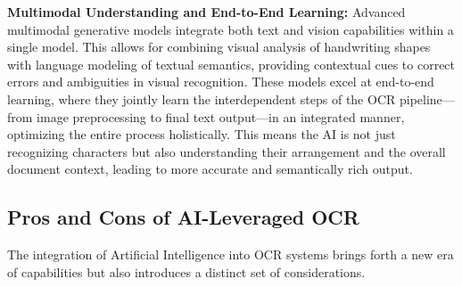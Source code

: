 \textbf{Multimodal Understanding and End-to-End Learning:} Advanced multimodal generative models integrate both text and vision capabilities within a single model. This allows for combining visual analysis of handwriting shapes with language modeling of textual semantics, providing contextual cues to correct errors and ambiguities in visual recognition. These models excel at end-to-end learning, where they jointly learn the interdependent steps of the OCR pipeline—from image preprocessing to final text output—in an integrated manner, optimizing the entire process holistically. This means the AI is not just recognizing characters but also understanding their arrangement and the overall document context, leading to more accurate and semantically rich output.

\subsection{Pros and Cons of AI-Leveraged OCR}

The integration of Artificial Intelligence into OCR systems brings forth a new era of capabilities but also introduces a distinct set of considerations.

